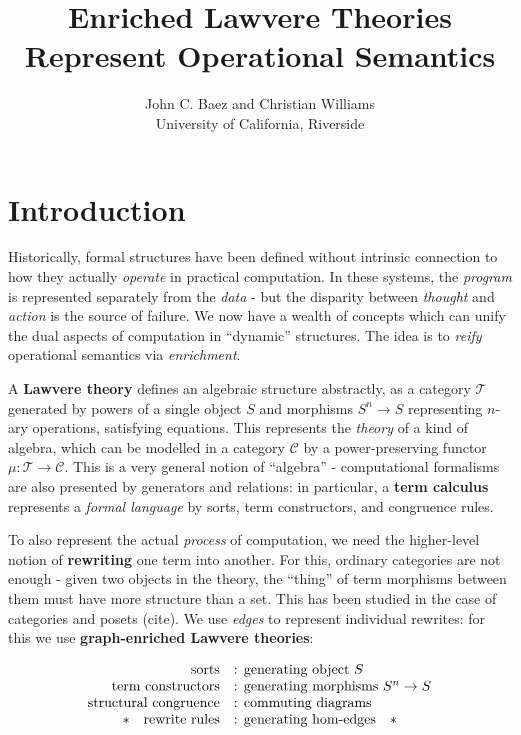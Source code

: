 \documentclass[a4paper,UKenglish]{article}
\newcommand{\C}{\mathscr{C}}
\newcommand{\T}{\mathscr{T}}
\begin{document}
\title{Enriched Lawvere Theories Represent Operational Semantics}
\author{John C. Baez and Christian Williams\\University of California, Riverside}

\maketitle

\section{Introduction}

Historically, formal structures have been defined without intrinsic connection to how they actually \textit{operate} in practical computation. In these systems, the \textit{program} is represented separately from the \textit{data} - but the disparity between \textit{thought} and \textit{action} is the source of failure. We now have a wealth of concepts which can unify the dual aspects of computation in ``dynamic'' structures. The idea is to \textit{reify} operational semantics via \textit{enrichment}.

A \textbf{Lawvere theory} \cite{lawvere} defines an algebraic structure abstractly, as a category $\T$ generated by powers of a single object $S$ and morphisms $S^n \to S$ representing $n$-ary operations, satisfying equations. This represents the \textit{theory} of a kind of algebra, which can be modelled in a category $\C$ by a power-preserving functor $\mu:\T \to \C$. This is a very general notion of ``algebra'' - computational formalisms are also presented by generators and relations: in particular, a \textbf{term calculus} represents a \textit{formal language} by sorts, term constructors, and congruence rules.

To also represent the actual \textit{process} of computation, we need the higher-level notion of \textbf{rewriting} one term into another. For this, ordinary categories are not enough - given two objects in the theory, the ``thing'' of term morphisms between them must have more structure than a set. This has been studied in the case of categories and posets (cite). We use \textit{edges} to represent individual rewrites: for this we use \textbf{graph-enriched Lawvere theories}:

\[\begin{array}{rl}
\text{sorts} & \text{: generating object } S\\
\text{term constructors} & \text{: generating morphisms } S^n \to S\\
\text{structural congruence} & \text{: commuting diagrams}\\
\text{\textasteriskcentered \quad rewrite rules} & \text{: generating hom-edges\quad\textasteriskcentered}\\
\end{array}\]
\end{document}
